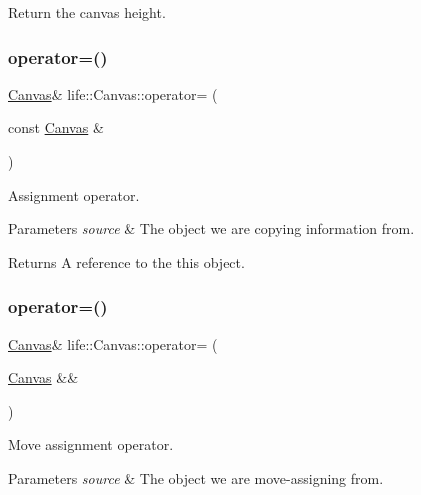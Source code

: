 Return the canvas height. 

\mbox{\label{classlife_1_1_canvas_a9263b4e39d40060948b8d0744f1cb5ca}} 
\subsubsection{\texorpdfstring{operator=()}{operator=()}\hspace{0.1cm}{\footnotesize\ttfamily [1/2]}}
{\footnotesize\ttfamily \mbox{\hyperlink{classlife_1_1_canvas}{Canvas}}\& life\+::\+Canvas\+::operator= (\begin{DoxyParamCaption}\item[{const \mbox{\hyperlink{classlife_1_1_canvas}{Canvas}} \&}]{ }\end{DoxyParamCaption})}



Assignment operator. 


\begin{DoxyParams}{Parameters}
{\em source} & The object we are copying information from. \\
\hline
\end{DoxyParams}
\begin{DoxyReturn}{Returns}
A reference to the {\ttfamily this} object. 
\end{DoxyReturn}
\mbox{\label{classlife_1_1_canvas_ab0995a0cbff8bf9c701553c6871c20b9}} 
\subsubsection{\texorpdfstring{operator=()}{operator=()}\hspace{0.1cm}{\footnotesize\ttfamily [2/2]}}
{\footnotesize\ttfamily \mbox{\hyperlink{classlife_1_1_canvas}{Canvas}}\& life\+::\+Canvas\+::operator= (\begin{DoxyParamCaption}\item[{\mbox{\hyperlink{classlife_1_1_canvas}{Canvas}} \&\&}]{ }\end{DoxyParamCaption})}



Move assignment operator. 


\begin{DoxyParams}{Parameters}
{\em source} & The object we are move-\/assigning from. \\
\hline
\end{DoxyParams}
\mbox{\label{classlife_1_1_canvas_add0ca521248ddabdb6ab11fea8f8012a}} 

